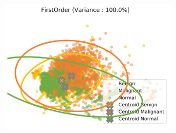 \begin{figure}[H]
    \centering
    \begin{subfigure}{.5\textwidth}
      \includegraphics[width=\textwidth]{contents/chapter_4/resources/visualisation_spatial_FirstOrder.png}
    \end{subfigure}
    

\end{figure}
